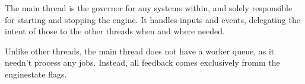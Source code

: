 The main thread is the governor for any systems within, and solely responsible for starting and stopping the engine. It handles inputs and events, delegating the intent of those to the other threads when and where needed.

Unlike other threads, the main thread does not have a worker queue, as it needn't process any jobs. Instead, all feedback comes exclusively fromm the enginestate flags. 
